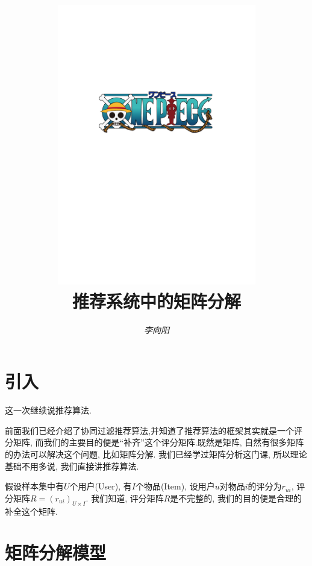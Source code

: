 \documentclass[a4paper,UTF8]{ctexart}
\theoremstyle{plain} \newtheorem{theorem}{定理}[section]
\theoremstyle{plain} \newtheorem{definition}{定义}[section]
\theoremstyle{plain} \newtheorem{lemma}{引理}[section]
\theoremstyle{plain} \newtheorem{proposition}{命题}[section]
\theoremstyle{plain} \newtheorem{example}{例}[section]
\theoremstyle{plain} \newtheorem{remark}{注}[section]
\theoremstyle{plain} \newtheorem{corollary}{推论}[section]
\begin{document}
\title{
\includegraphics[width=0.65\textwidth]{onepiece.pdf}\\
\vspace{2em}
\textbf{推荐系统中的矩阵分解}}
\author{\emph{李向阳} \quad \color{blue}{d1142845997@gmail.com}}
\date{}


\maketitle
\thispagestyle{empty}

\newpage


\tableofcontents

\newpage

\section{引入}
这一次继续说推荐算法.

前面我们已经介绍了协同过滤推荐算法,并知道了推荐算法的框架其实就是一个评分矩阵, 而我们的主要目的便是“补齐”这个评分矩阵.既然是矩阵, 自然有很多矩阵的办法可以解决这个问题, 比如矩阵分解. 我们已经学过矩阵分析这门课, 所以理论基础不用多说, 我们直接讲推荐算法.

假设样本集中有$U$个用户(User), 有$I$个物品(Item), 设用户$u$对物品$i$的评分为$r_{ui}$, 评分矩阵$R = (r_{ui})_{U \times I}$. 我们知道, 评分矩阵$R$是不完整的, 我们的目的便是合理的补全这个矩阵.


\section{矩阵分解模型}
\end{document}

